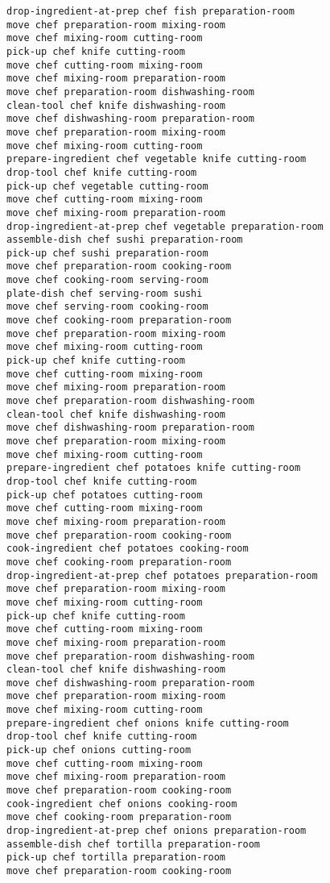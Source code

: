 \documentclass[a4paper,12pt]{article}
\begin{document}
\begin{lstlisting}[language=PDDL, caption=Plan for Problem 3]
drop-ingredient-at-prep chef fish preparation-room 
move chef preparation-room mixing-room 
move chef mixing-room cutting-room 
pick-up chef knife cutting-room 
move chef cutting-room mixing-room 
move chef mixing-room preparation-room 
move chef preparation-room dishwashing-room 
clean-tool chef knife dishwashing-room 
move chef dishwashing-room preparation-room 
move chef preparation-room mixing-room 
move chef mixing-room cutting-room 
prepare-ingredient chef vegetable knife cutting-room 
drop-tool chef knife cutting-room 
pick-up chef vegetable cutting-room 
move chef cutting-room mixing-room 
move chef mixing-room preparation-room 
drop-ingredient-at-prep chef vegetable preparation-room 
assemble-dish chef sushi preparation-room 
pick-up chef sushi preparation-room 
move chef preparation-room cooking-room 
move chef cooking-room serving-room 
plate-dish chef serving-room sushi 
move chef serving-room cooking-room 
move chef cooking-room preparation-room 
move chef preparation-room mixing-room 
move chef mixing-room cutting-room 
pick-up chef knife cutting-room 
move chef cutting-room mixing-room 
move chef mixing-room preparation-room 
move chef preparation-room dishwashing-room 
clean-tool chef knife dishwashing-room 
move chef dishwashing-room preparation-room 
move chef preparation-room mixing-room 
move chef mixing-room cutting-room 
prepare-ingredient chef potatoes knife cutting-room 
drop-tool chef knife cutting-room 
pick-up chef potatoes cutting-room 
move chef cutting-room mixing-room 
move chef mixing-room preparation-room 
move chef preparation-room cooking-room 
cook-ingredient chef potatoes cooking-room 
move chef cooking-room preparation-room 
drop-ingredient-at-prep chef potatoes preparation-room 
move chef preparation-room mixing-room 
move chef mixing-room cutting-room 
pick-up chef knife cutting-room 
move chef cutting-room mixing-room 
move chef mixing-room preparation-room 
move chef preparation-room dishwashing-room 
clean-tool chef knife dishwashing-room 
move chef dishwashing-room preparation-room 
move chef preparation-room mixing-room 
move chef mixing-room cutting-room 
prepare-ingredient chef onions knife cutting-room 
drop-tool chef knife cutting-room 
pick-up chef onions cutting-room 
move chef cutting-room mixing-room 
move chef mixing-room preparation-room 
move chef preparation-room cooking-room 
cook-ingredient chef onions cooking-room 
move chef cooking-room preparation-room 
drop-ingredient-at-prep chef onions preparation-room 
assemble-dish chef tortilla preparation-room 
pick-up chef tortilla preparation-room 
move chef preparation-room cooking-room 

\end{lstlisting}
\end{document}
